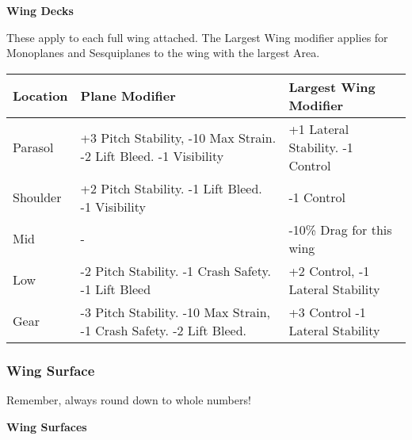 \documentclass{article}
\begin{document}
\textbf{Wing Decks}

These apply to each full wing attached. The Largest Wing modifier
applies for Monoplanes and Sesquiplanes to the wing with the largest
Area.

\begin{tabular}{|l|l|l|}
    \hline
    Location   & Plane Modifier                                               & Largest Wing Modifier    \\\hline
    Parasol    & +3 Pitch Stability, -10 Max Strain. -2 Lift Bleed. -1
    Visibility & +1 Lateral Stability. -1 Control                                                        \\\hline
    Shoulder   & +2 Pitch Stability. -1 Lift Bleed. -1 Visibility             & -1
    Control                                                                                              \\\hline
    Mid        & -                                                            & -10\% Drag for this wing \\\hline
    Low        & -2 Pitch Stability. -1 Crash Safety. -1 Lift Bleed           & +2 Control,
    -1 Lateral Stability                                                                                 \\\hline
    Gear       & -3 Pitch Stability. -10 Max Strain, -1 Crash Safety. -2 Lift
    Bleed.     & +3 Control -1 Lateral Stability                                                         \\\hline
\end{tabular}

\subsubsection{Wing Surface}
\label{_Wing Surface}

Remember, always round down to whole numbers!

\textbf{Wing Surfaces}
\end{document}
